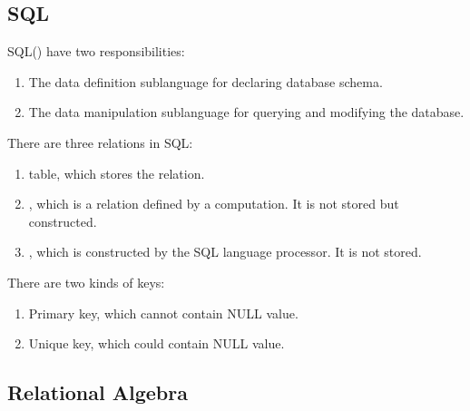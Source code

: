 
\subsection{SQL}

SQL() have two responsibilities:
\begin{enumerate}
    \item The data definition sublanguage for declaring database schema.
    \item The data manipulation sublanguage for querying and modifying the database.
\end{enumerate}


There are three relations in SQL:

\begin{enumerate}
    \item table, which stores the relation.
    \item {}, which is a relation defined by a computation. It is not stored but constructed.
    \item {}, which is constructed by the SQL language processor. It is not stored.
\end{enumerate}

There are two kinds of keys:
\begin{enumerate}
    \item Primary key, which cannot contain NULL value.
    \item Unique key, which could contain NULL value.
\end{enumerate}



\subsection{Relational Algebra}

